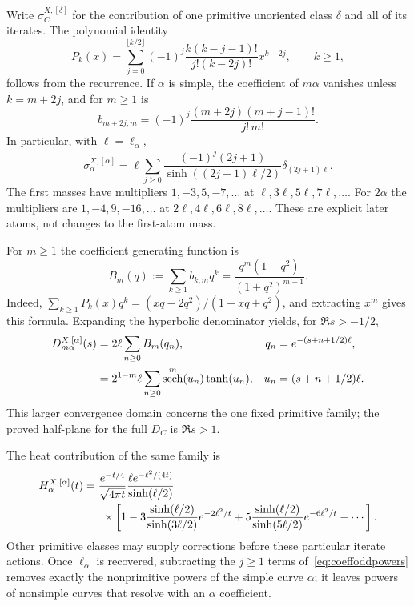 \documentclass[11pt,a4paper]{article}
\numberwithin{equation}{section}
\theoremstyle{definition}
\theoremstyle{remark}
\DeclareMathOperator{\sech}{sech}
\begin{document}
Write $\sigma_C^{X,[\delta]}$ for the contribution of one primitive
unoriented class $\delta$ and all of its iterates. The polynomial
identity
\begin{equation}
 P_k(x)=\sum_{j=0}^{\lfloor k/2\rfloor}
 (-1)^j\frac{k(k-j-1)!}{j!(k-2j)!}x^{k-2j},\qquad k\geq1,
 \label{eq:coeffChebyshev}
\end{equation}
follows from the recurrence. If $\alpha$ is simple, the coefficient
of $m\alpha$ vanishes unless $k=m+2j$, and for $m\geq1$ is
\begin{equation}
 b_{m+2j,m}=(-1)^j
  \frac{(m+2j)(m+j-1)!}{j!\,m!}.
 \label{eq:coeffsimplepowers}
\end{equation}
In particular, with $\ell=\ell_\alpha$,
\begin{equation}
 \boxed{
 \sigma_\alpha^{X,[\alpha]}
 =\ell\sum_{j\geq0}
   \frac{(-1)^j(2j+1)}{\sinh((2j+1)\ell/2)}
   \delta_{(2j+1)\ell}.
 }
 \label{eq:coeffoddpowers}
\end{equation}
The first masses have multipliers $1,-3,5,-7,\ldots$ at
$\ell,3\ell,5\ell,7\ell,\ldots$. For $2\alpha$ the multipliers
are $1,-4,9,-16,\ldots$ at $2\ell,4\ell,6\ell,8\ell,\ldots$.
These are explicit later atoms, not changes to the first-atom mass.

For $m\geq1$ the coefficient generating function is
\begin{equation}
 B_m(q):=\sum_{k\geq1}b_{k,m}q^k
 =\frac{q^m(1-q^2)}{(1+q^2)^{m+1}}.
 \label{eq:coeffpowergenerating}
\end{equation}
Indeed,
$\sum_{k\geq1}P_k(x)q^k=(xq-2q^2)/(1-xq+q^2)$,
and extracting $x^m$ gives this formula. Expanding the hyperbolic
denominator yields, for $\Re s>-1/2$,
\begin{align}
 D_{m\alpha}^{X,[\alpha]}(s)
 &=2\ell\sum_{n\geq0}B_m(q_n),
 &q_n&=e^{-(s+n+1/2)\ell},\notag\\
 &=2^{1-m}\ell\sum_{n\geq0}
   \sech^m(u_n)\tanh(u_n),
 &u_n&=(s+n+1/2)\ell.
 \label{eq:coeffpowerLaplace}
\end{align}
This larger convergence domain concerns the one fixed primitive
family; the proved half-plane for the full $D_C$ is $\Re s>1$.

The heat contribution of the same family is
\begin{align}
 H_\alpha^{X,[\alpha]}(t)
 ={}&\frac{e^{-t/4}}{\sqrt{4\pi t}}
 \frac{\ell e^{-\ell^2/(4t)}}{\sinh(\ell/2)}\notag\\
 &\mathrel{}\times\left[
 1-3\frac{\sinh(\ell/2)}{\sinh(3\ell/2)}e^{-2\ell^2/t}
 +5\frac{\sinh(\ell/2)}{\sinh(5\ell/2)}e^{-6\ell^2/t}
 -\cdots\right].
 \label{eq:coeffpowerheat}
\end{align}
Other primitive classes may supply corrections before these particular
iterate actions. Once $\ell_\alpha$ is recovered, subtracting the
$j\geq1$ terms of~\eqref{eq:coeffoddpowers} removes exactly the
nonprimitive powers of the simple curve $\alpha$; it leaves powers
of nonsimple curves that resolve with an $\alpha$ coefficient.
\end{document}
